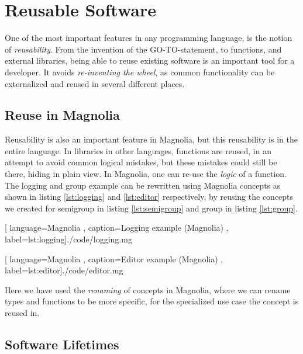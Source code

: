 \section{Reusable Software}

One of the most important features in any programming language, is the notion
of \textit{reusability}. From the invention of the GO-TO-statement,
to functions, and external libraries, being able to reuse existing software is
an important tool for a developer. It avoids \textit{re-inventing the wheel}, as
common functionality can be externalized and reused in several different places.

\subsection{Reuse in Magnolia}

Reusability is also an important feature in Magnolia, but this reusability is in
the entire language. In libraries in other languages, functions are reused, in
an attempt to avoid common logical mistakes, but these mistakes could still be
there, hiding in plain view. In Magnolia, one can re-use the \textit{logic} of a
function. The logging and group example can be rewritten using Magnolia concepts
as shown in listing \ref{lst:logging} and \ref{lst:editor} respectively, by
reusing the concepts we created for semigroup in listing \ref{lst:semigroup} and group
in listing \ref{lst:group}.

\begin{center}
  
    [ language=Magnolia
    , caption={Logging example (Magnolia)}
    , label=lst:logging]{./code/logging.mg}
\end{center}

\begin{center}
  
    [ language=Magnolia
    , caption={Editor example (Magnolia)}
    , label=lst:editor]{./code/editor.mg}
\end{center}

Here we have used the \textit{renaming} of concepts in Magnolia, where we can
rename types and functions to be more specific, for the specialized use case the
concept is reused in.

\subsection{Software Lifetimes}


